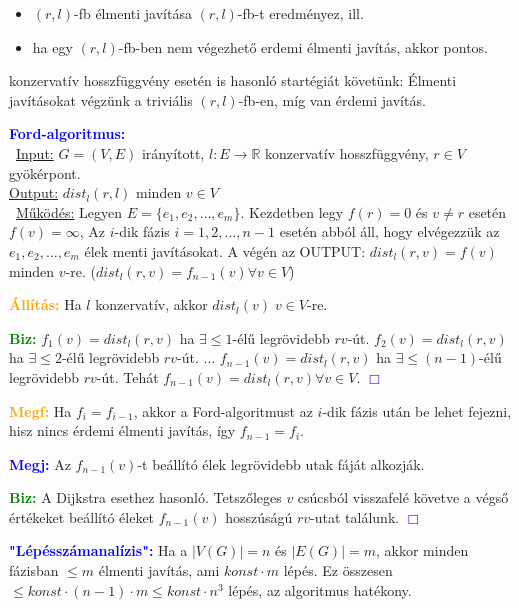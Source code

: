 \documentclass[../../szobeli.tex]{subfiles}
\begin{document}
\begin{itemize}
        \begin{itemize}
            \item $(r,l)$-fb élmenti javítása $(r,l)$-fb-t eredményez, ill. 
            \item ha egy $(r,l)$-fb-ben nem végezhető erdemi élmenti javítás, akkor pontos.
        \end{itemize}

        konzervatív hosszfüggvény esetén is hasonló startégiát követünk: Élmenti javításokat végzünk a triviális $(r,l)$-fb-en, míg van érdemi javítás.

        \textcolor{blue}{\textbf{Ford-algoritmus:}} \\ \underline{Input:} $G = (V,E)$ irányított, $l:E \rightarrow \mathbb{R}$ konzervatív hosszfüggvény, $r \in V$ gyökérpont. \\ \underline{Output:} $dist_l(r,l)$ minden $ v \in V$ \\ \underline{Működés:} Legyen $E = \{e_1, e_2,\dots, e_m\}$. Kezdetben legy $f(r)=0$ és $v\neq r$ esetén $f(v)=\infty$, Az $i$-dik fázis $i=1 ,2 ,\dots, n-1$ esetén abból áll, hogy elvégezzük az $e_1, e_2,\dots, e_m$ élek menti javításokat. A végén az OUTPUT: $dist_l(r,v) = f(v)$ minden $v$-re. ($dist_l(r,v) = f_{n-1}(v)\forall v\in V$)

        \textcolor{orange}{\textbf{Állítás:}} Ha $l$ konzervatív, akkor $dist_l(v)\; v \in V$-re.

        \textcolor{green}{\textbf{Biz:}} $f_1(v) = dist_l(r,v)$ ha $\exists \leq 1$-élű legrövidebb $rv$-út. $f_2(v) = dist_l(r,v)$ ha $\exists \leq 2$-élű legrövidebb $rv$-út. $\dots$ $f_{n-1}(v) = dist_l(r,v)$ ha $\exists \leq (n-1)$-élű legrövidebb $rv$-út. Tehát $f_{n-1}(v) = dist_l(r,v) \forall v \in V$.  \textcolor{blue}{$\Box$} 

        \textcolor{orange}{\textbf{Megf:}} Ha $f_i = f_{i-1}$, akkor a Ford-algoritmust az $i$-dik fázis után be lehet fejezni, hisz nincs érdemi élmenti javítás, így $f_{n-1} = f_i$.

        \textcolor{blue}{\textbf{Megj:}} Az $f_{n-1}(v)$-t beállító élek legrövidebb utak fáját alkozják. 

        \textcolor{green}{\textbf{Biz:}} A Dijkstra esethez hasonló. Tetszőleges $v$ csúcsból visszafelé követve a végső értékeket beállító éleket $f_{n-1}(v)$ hosszúságú $rv$-utat találunk.  \textcolor{blue}{$\Box$} 

        \textcolor{blue}{\textbf{"Lépésszámanalízis":}} Ha a $|V(G)| = n$ és $|E(G)| = m$, akkor minden fázisban $\leq m$ élmenti javítás, ami $konst \cdot m$ lépés. Ez összesen $\leq konst \cdot (n-1) \cdot m \leq konst \cdot n^3$ lépés, az algoritmus hatékony.

    \end{itemize}
\end{document}
